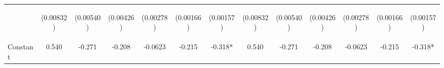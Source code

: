 \documentclass[]{article}
\begin{document}
\begin{center}
\begin{tabular}{lcccccccccccc}
\vspace{4pt} & \begin{footnotesize}(0.00832)\end{footnotesize} & \begin{footnotesize}(0.00540)\end{footnotesize} & \begin{footnotesize}(0.00426)\end{footnotesize} & \begin{footnotesize}(0.00278)\end{footnotesize} & \begin{footnotesize}(0.00166)\end{footnotesize} & \begin{footnotesize}(0.00157)\end{footnotesize} & \begin{footnotesize}(0.00832)\end{footnotesize} & \begin{footnotesize}(0.00540)\end{footnotesize} & \begin{footnotesize}(0.00426)\end{footnotesize} & \begin{footnotesize}(0.00278)\end{footnotesize} & \begin{footnotesize}(0.00166)\end{footnotesize} & \begin{footnotesize}(0.00157)\end{footnotesize} \\
Constant & 0.540 & -0.271 & -0.208 & -0.0623 & -0.215 & -0.318* & 0.540 & -0.271 & -0.208 & -0.0623 & -0.215 & -0.318* \\

\end{tabular}
\end{center}
\end{document}
